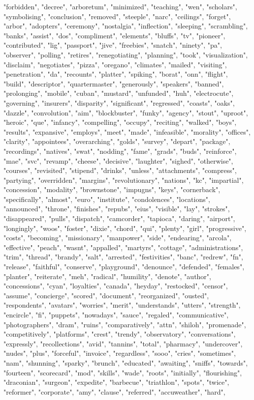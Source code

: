 "forbidden", "decree", "arboretum", "minimized", "teaching", "wen", "scholars", "symbolising", "conclusion", "removed", "steeple", "narc", "ceilings", "forget", "arbor", "adopters", "ceremony", "nostalgia", "inflection", "sleeping", "scrambling", "banks", "assist", "dos", "compliment", "elements", "bluffs", "tv", "pioneer", "contributed", "lig", "passport", "jive", "freebies", "snatch", "ninety", "pa", "observer", "polling", "retires", "renegotiating", "planning", "took", "visualization", "disclaim", "negotiates", "pizza", "oregano", "climates", "mailed", "visiting", "penetration", "da", "recounts", "platter", "spiking", "borat", "onn", "flight", "build", "descriptor", "quartermaster", "generously", "speakers", "banned", "prolonging", "mobile", "cuban", "mustard", "unfunded", "huh", "electrocute", "governing", "insurers", "disparity", "significant", "regressed", "coasts", "oaks", "dazzle", "convolution", "aim", "blockbuster", "funky", "agency", "stout", "uproot", "heroic", "que", "infancy", "compelling", "occupy", "reciting", "walked", "boys", "results", "expansive", "employs", "meet", "made", "infeasible", "morality", "offices", "clarity", "appointees", "overarching", "golds", "survey", "depart", "package", "recordings", "natives", "swat", "nodding", "fame", "grads", "buds", "reinforce", "mae", "svc", "revamp", "cheese", "decisive", "laughter", "sighed", "otherwise", "courses", "revisited", "stipend", "drinks", "unless", "attachments", "compress", "partying", "overridden", "margins", "revolutionary", "nations", "kc", "impartial", "concession", "modality", "brownstone", "impugns", "keys", "cornerback", "specifically", "almost", "euro", "institute", "condolences", "locations", "announced", "throne", "finishes", "repubs", "eius", "visible", "lay", "strokes", "disappeared", "pulls", "dispatch", "camcorder", "tapioca", "daring", "airport", "longingly", "woos", "foster", "dixie", "chord", "qui", "plenty", "girl", "progressive", "costs", "becoming", "missionary", "manpower", "side", "endearing", "arcola", "effective", "peach", "wasnt", "appalled", "martyrs", "cottage", "administrations", "trim", "thread", "brandy", "salt", "arrested", "festivities", "banc", "redrew", "fn", "release", "faithful", "conserve", "playground", "denounce", "defended", "females", "planter", "reiterate", "meh", "radical", "humility", "denote", "author", "concessions", "cyan", "loyalties", "canada", "heyday", "restocked", "censor", "assume", "concierge", "scored", "document", "reorganized", "ousted", "respondents", "avatars", "worries", "merit", "understands", "utters", "strength", "encircle", "fi", "puppets", "nowadays", "sauce", "regaled", "communicative", "photographers", "dram", "ruins", "comparatively", "attn", "shiloh", "promenade", "competitively", "platforms", "crest", "trendy", "observatory", "conversations", "expressly", "recollections", "avid", "tannins", "total", "pharmacy", "undercover", "nudes", "plus", "forceful", "invoice", "regardless", "sooo", "cries", "sometimes", "nam", "shunning", "sparky", "brunch", "educated", "awaiting", "sniffs", "towards", "fourteen", "scorecard", "mod", "skills", "wade", "roots", "initially", "flourishing", "draconian", "surgeon", "expedite", "barbecue", "triathlon", "spots", "twice", "reformer", "corporate", "amy", "clause", "referred", "accuweather", "hard", 
